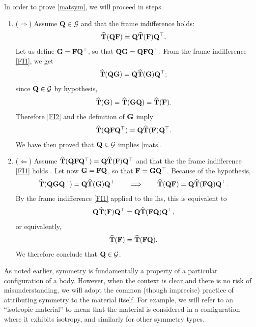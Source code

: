 In order to prove \eqref{matsym}, we  will proceed in steps.
\begin{enumerate}
	\item ($\Rightarrow$) Assume $\mathbf{Q} \in \mathcal{G}$ and that the frame indifference holds:
	\begin{equation}\label{FI1}
		\widehat{\mathbf{T}}(\mathbf{Q}\mathbf{F})=\mathbf{Q}\widehat{\mathbf{T}}(\mathbf{F})\mathbf{Q}^\top.
	\end{equation}
Let us define $\mathbf{G}=\mathbf{F}\mathbf{Q}^\top$, so that $\mathbf{Q}\mathbf{G}=\mathbf{Q}\mathbf{F}\mathbf{Q}^\top$. From the frame indifference \eqref{FI1}, we get
\begin{equation}\label{FI2}
	\widehat{\mathbf{T}}(\mathbf{Q}\mathbf{G})=\mathbf{Q}\widehat{\mathbf{T}}(\mathbf{G})\mathbf{Q}^\top;
\end{equation}
since $\mathbf{Q}\in\mathcal{G}$ by hypothesis,
\begin{equation}
	\widehat{\mathbf{T}}(\mathbf{G})=	\widehat{\mathbf{T}}(\mathbf{G}\mathbf{Q})=\widehat{\mathbf{T}}(\mathbf{F}).
\end{equation}
Therefore \eqref{FI2}  and the definition of $\mathbf{G}$ imply
\begin{equation}\label{mats}
		\widehat{\mathbf{T}}(\mathbf{Q}\mathbf{F}\mathbf{Q}^\top)=\mathbf{Q}\widehat{\mathbf{T}}(\mathbf{F})\mathbf{Q}^\top.
\end{equation}
We have then proved  that $\mathbf{Q}\in\mathcal{G}$ implies \eqref{mats}.
\item ($\Leftarrow$) Assume $	\widehat{\mathbf{T}}(\mathbf{Q}\mathbf{F}\mathbf{Q}^\top)=\mathbf{Q}\widehat{\mathbf{T}}(\mathbf{F})\mathbf{Q}^\top$ and that the the frame indifference \eqref{FI1} holds . Let now $\mathbf{G}=\mathbf{F}\mathbf{Q}$, so that $\mathbf{F}=\mathbf{G}\mathbf{Q}^\top$. Because of the hypothesis,
\begin{equation}
	\widehat{\mathbf{T}}(\mathbf{Q}\mathbf{G}\mathbf{Q}^\top)=\mathbf{Q}\widehat{\mathbf{T}}(\mathbf{G})\mathbf{Q}^\top \qquad \Longrightarrow\qquad 	\widehat{\mathbf{T}}(\mathbf{Q}\mathbf{F})=\mathbf{Q}\widehat{\mathbf{T}}(\mathbf{F}\mathbf{Q})\mathbf{Q}^\top.
\end{equation}
By the frame indifference \eqref{FI1} applied to the lhs,  this is equivalent to 
\begin{equation}
\mathbf{Q}\widehat{\mathbf{T}}(\mathbf{F})\mathbf{Q}^\top=\mathbf{Q}\widehat{\mathbf{T}}(\mathbf{F}\mathbf{Q})\mathbf{Q}^\top, 
\end{equation}
or equivalently,
\begin{equation}
\widehat{\mathbf{T}}(\mathbf{F})=\widehat{\mathbf{T}}(\mathbf{F}\mathbf{Q}).
\end{equation}
We therefore conclude that $\mathbf{Q}\in\mathcal{G}$.
\end{enumerate}

\begin{remark}
	As noted earlier, symmetry is fundamentally a property of a particular configuration of a body. However, when the context is clear and there is no risk of misunderstanding, we will adopt the common (though imprecise) practice of attributing symmetry to the material itself. For example, we will refer to an ``isotropic material'' to mean that the material is considered in a configuration where it exhibits isotropy, and similarly for other symmetry types.
\end{remark}

